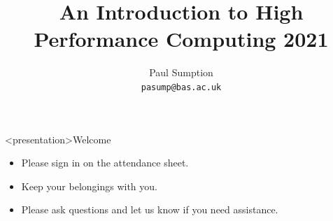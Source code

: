\documentclass[handout]{beamer} %
\title[British Antarctic Survey] %
{An Introduction to High Performance Computing 2021}
\author[Paul Sumption]%
{Paul Sumption\\ \texttt{pasump@bas.ac.uk}}
\begin{document}
{
%
\begin{frame}
\titlepage
\end{frame}
}

{
\begin{frame}<presentation>{Welcome}
%
\begin{itemize}
\item{Please sign in on the {\color{red}attendance sheet}.}
\item{Keep your belongings with you.}
\item\alert{Please ask questions and let us know if you need assistance.}
\end{itemize}
\end{frame}
}
\end{document}
